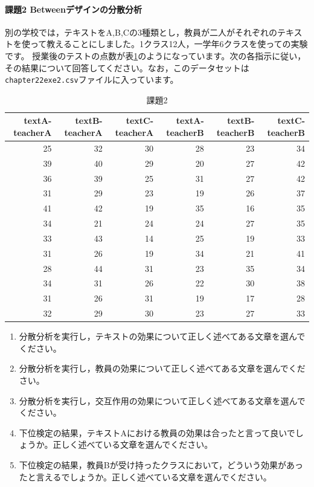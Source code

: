 \documentclass{ltjsarticle}
\begin{document}
\paragraph{課題2 Betweenデザインの分散分析}
別の学校では，テキストをA,B,Cの3種類とし，教員が二人がそれぞれのテキストを使って教えることにしました。1クラス12人，一学年6クラスを使っての実験です。
授業後のテストの点数が表\ref{L23::exe2}のようになっています。次の各指示に従い，その結果について回答してください。なお，このデータセットは\texttt{chapter22exe2.csv}ファイルに入っています。
\begin{table}[ht]
  \centering
  \caption{課題2}
\begin{tabular}{rrrrrr}
  \hline
  textA-teacherA & textB-teacherA & textC-teacherA & textA-teacherB & textB-teacherB & textC-teacherB\\
  \hline
  25 & 32 & 30 & 28 & 23 & 34\\
  39 & 40 & 29 & 20 & 27 & 42\\
  36 & 39 & 25 & 31 & 27 & 42\\
  31 & 29 & 23 & 19 & 26 & 37\\
  41 & 42 & 19 & 35 & 16 & 35\\
  34 & 21 & 24 & 24 & 27 & 35\\
  33 & 43 & 14 & 25 & 19 & 33\\
  31 & 26 & 19 & 34 & 21 & 41\\
  28 & 44 & 31 & 23 & 35 & 34\\
  34 & 31 & 26 & 22 & 30 & 38\\
  31 & 26 & 31 & 19 & 17 & 28\\
  32 & 29 & 30 & 23 & 27 & 33\\
  \hline
  \end{tabular}
  \label{L23::exe2}
\end{table}

\begin{enumerate}
  \item 分散分析を実行し，テキストの効果について正しく述べてある文章を選んでください。
  \item 分散分析を実行し，教員の効果について正しく述べてある文章を選んでください。
  \item 分散分析を実行し，交互作用の効果について正しく述べてある文章を選んでください。
  \item 下位検定の結果，テキストAにおける教員の効果は合ったと言って良いでしょうか。正しく述べている文章を選んでください。
  \item 下位検定の結果，教員Bが受け持ったクラスにおいて，どういう効果があったと言えるでしょうか。正しく述べている文章を選んでください。
\end{enumerate}
\end{document}
